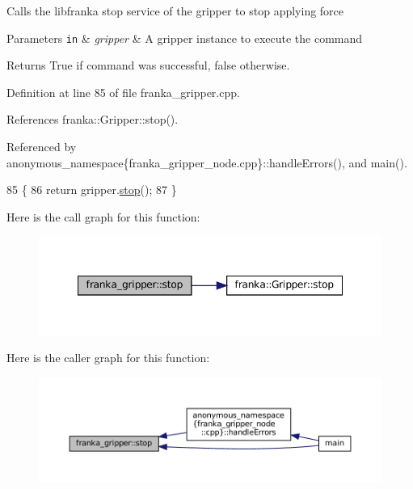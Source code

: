 Calls the libfranka stop service of the gripper to stop applying force


\begin{DoxyParams}[1]{Parameters}
\mbox{\tt in}  & {\em gripper} & A gripper instance to execute the command\\
\hline
\end{DoxyParams}
\begin{DoxyReturn}{Returns}
True if command was successful, false otherwise. 
\end{DoxyReturn}


Definition at line 85 of file franka\+\_\+gripper.\+cpp.



References franka\+::\+Gripper\+::stop().



Referenced by anonymous\+\_\+namespace\{franka\+\_\+gripper\+\_\+node.\+cpp\}\+::handle\+Errors(), and main().


\begin{DoxyCode}
85                                                                    \{
86   \textcolor{keywordflow}{return} gripper.\hyperlink{classfranka_1_1Gripper_add7397fb6c5631650c139d26a85c8e1d}{stop}();
87 \}
\end{DoxyCode}
Here is the call graph for this function\+:
\nopagebreak
\begin{figure}[H]
\begin{center}
\leavevmode
\includegraphics[width=348pt]{namespacefranka__gripper_a4030b4a443c096b625233396f4314a04_cgraph}
\end{center}
\end{figure}
Here is the caller graph for this function\+:
\nopagebreak
\begin{figure}[H]
\begin{center}
\leavevmode
\includegraphics[width=350pt]{namespacefranka__gripper_a4030b4a443c096b625233396f4314a04_icgraph}
\end{center}
\end{figure}
\mbox{\label{namespacefranka__gripper_a8d26c346602cc39ab2495f2fffc99d9c}} 
